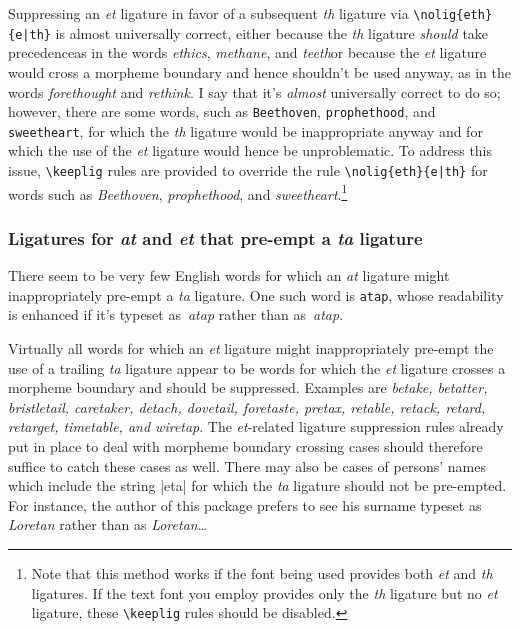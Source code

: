 \documentclass[11pt]{article}
\newcommand{\opt}[1]{\texttt{#1}}
\newcommand{\cmmd}[1]{\texttt{\textbackslash #1}}
\begin{document}
Suppressing an \emph{et} ligature in favor of a subsequent \emph{th} ligature via \Verb+\nolig{eth}{e|th}+ is almost universally correct, either because the \emph{th} ligature \emph{should} take precedence\textemdash as in the words \emph{ethics}, \emph{methane}, and \emph{teeth}\textemdash or because the \emph{et} ligature would cross a morpheme boundary and hence shouldn't be used anyway, as in the words \emph{forethought} and \emph{rethink}. 
I say that it's \emph{almost} universally correct to do so; however, there are some words, such as \opt{Beethoven}, \opt{prophethood}, and \opt{sweetheart}, for which the \emph{th} ligature would be inappropriate anyway and for which the use of the \emph{et} ligature would hence be unproblematic. To address this issue, \cmmd{keeplig} rules are provided to override the rule \Verb+\nolig{eth}{e|th}+ for words such as \emph{Beethoven}, \emph{prophethood}, and \emph{sweetheart}.\footnote{Note that this method works if the font being used provides both \emph{et} and \emph{th} ligatures. If the text font you employ provides only the \emph{th} ligature but no \emph{et} ligature, these \cmmd{keeplig} rules should be disabled.}



\subsubsection*{Ligatures for \emph{at} and \emph{et} that pre-empt a \emph{ta} ligature}

There seem to be very few English words for which an \emph{at} ligature might inappropriately pre-empt a \emph{ta} ligature. One such word is \opt{atap}, whose readability is enhanced if it's typeset as~\emph{atap} rather than as~\emph{\mbox{at}ap}.

Virtually all words for which an \emph{et} ligature might inappropriately pre-empt the use of a trailing \emph{ta} ligature appear to be words for which the \emph{et} ligature crosses a morpheme boundary and should be suppressed. Examples are \emph{betake, betatter, bristletail, caretaker, detach, dovetail, foretaste, pretax, retable, retack, retard, retarget, timetable, \emph{and} wiretap}. The \emph{et}-related ligature suppression rules already put in place to deal with morpheme boundary crossing cases should therefore suffice to catch these cases as well. There may also be cases of persons' names which include the string |eta| for which the \emph{ta} ligature should not be pre-empted. For instance, the author of this package prefers to see his surname typeset as \emph{Loretan} rather than as \emph{Lor\mbox{et}an}\dots
\end{document}
